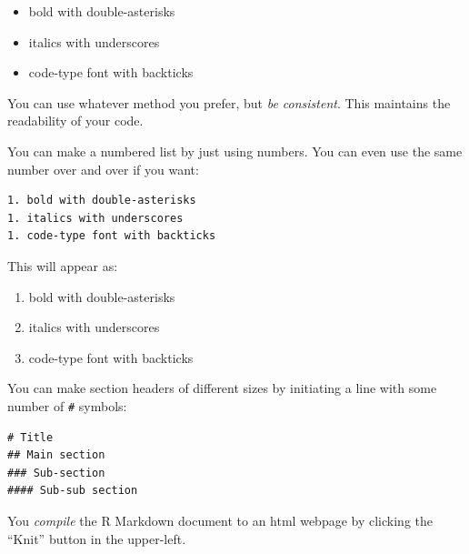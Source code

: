 \documentclass[]{book}
\providecommand{\tightlist}{%
  \setlength{\itemsep}{0pt}\setlength{\parskip}{0pt}}
\begin{document}
\begin{itemize}
\tightlist
\item
  bold with double-asterisks
\item
  italics with underscores
\item
  code-type font with backticks
\end{itemize}

You can use whatever method you prefer, but \emph{be consistent}. This
maintains the readability of your code.

You can make a numbered list by just using numbers. You can even use the
same number over and over if you want:

\begin{verbatim}
1. bold with double-asterisks
1. italics with underscores
1. code-type font with backticks
\end{verbatim}

This will appear as:

\begin{enumerate}
\def\labelenumi{\arabic{enumi}.}
\tightlist
\item
  bold with double-asterisks
\item
  italics with underscores
\item
  code-type font with backticks
\end{enumerate}

You can make section headers of different sizes by initiating a line
with some number of \texttt{\#} symbols:

\begin{verbatim}
# Title
## Main section
### Sub-section
#### Sub-sub section
\end{verbatim}

You \emph{compile} the R Markdown document to an html webpage by
clicking the ``Knit'' button in the upper-left.
\end{document}
